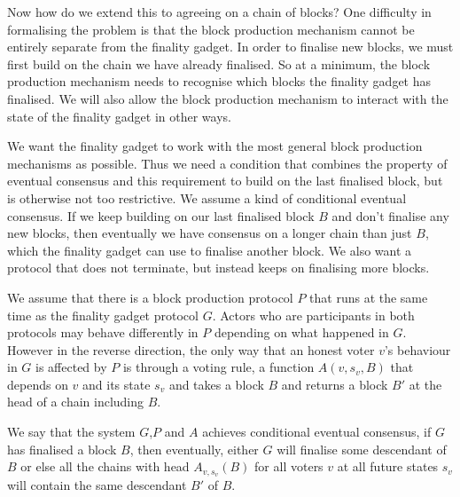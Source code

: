 \documentclass{article}
\begin{document}
Now how do we extend this to agreeing on a chain of blocks? One difficulty in formalising the problem is that the block production mechanism cannot be entirely separate from the finality gadget. In order to finalise new blocks, we must first build on the chain we have already finalised. So at a minimum, the block production mechanism needs to recognise which blocks the finality gadget has finalised. We will also allow the block production mechanism to interact with the state of the finality gadget in other ways.

We want the finality gadget to work with the most general block production mechanisms as possible. Thus we need a condition that combines the property of eventual consensus and this requirement to build on the last finalised block, but is otherwise not too restrictive.
We assume a kind of conditional eventual consensus.
If we keep building on our last finalised block $B$ and don't finalise any new blocks, then eventually we have consensus on a longer chain than just $B$, which the finality gadget can use to finalise another block.
We also want a protocol that does not terminate, but instead keeps on finalising more blocks. 

We assume that there is a block production protocol $P$ that runs at the same time as the finality gadget protocol $G$. Actors who are participants in both protocols may behave differently in $P$ depending on what happened in $G$.
However in the reverse direction, the only way that an honest voter $v$'s behaviour in $G$ is affected by $P$ is through a voting rule, a function $A(v,s_v,B)$ that depends on $v$ and its state $s_v$ and takes a block $B$ and returns a block $B'$ at the head of a chain including $B$.

We say that the system $G$,$P$ and $A$ achieves conditional eventual consensus, if $G$ has finalised a block $B$, then eventually, either $G$ will finalise some descendant of $B$ or else all the chains with head $A_{v,s_v}(B)$ for all voters $v$ at all future states $s_v$ will contain the same descendant $B'$ of $B$.
\end{document}
